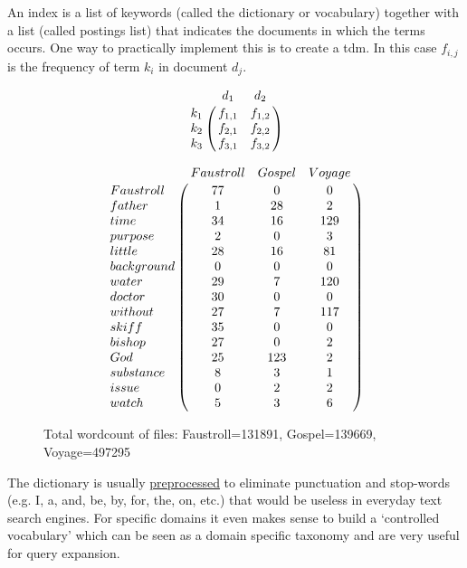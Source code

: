 An index is a list of keywords (called the dictionary or vocabulary) together with a list (called postings list) that indicates the documents in which the terms occurs. One way to practically implement this is to create a \gls{tdm}. In this case $f_{i,j}$ is the frequency of term $k_{i}$ in document $d_{j}$.

\begin{equation}
  \bbordermatrix{~ & d_1 & d_2 \cr %
        k_1 & f_{1,1} & f_{1,2} \cr %
        k_2 & f_{2,1} & f_{2,2} \cr %
        k_3 & f_{3,1} & f_{3,2}}
\label{eq:tdm}
\end{equation}


\begin{figure}[hb]
\[
  \bbordermatrix{
    ~ & Faustroll & Gospel & Voyage \cr %
    Faustroll & 77 & 0 & 0 \cr %
    father & 1 & 28 & 2 \cr %
    time & 34 & 16 & 129 \cr %
    purpose & 2 & 0 & 3 \cr %
    little & 28 & 16 & 81 \cr %
    background & 0 & 0 & 0 \cr %
    water & 29 & 7 & 120 \cr %
    doctor & 30 & 0 & 0 \cr %
    without & 27 & 7 & 117 \cr %
    skiff & 35 & 0 & 0 \cr %
    bishop & 27 & 0 & 2 \cr %
    God & 25 & 123 & 2 \cr %
    substance & 8 & 3 & 1 \cr %
    issue & 0 & 2 & 2 \cr %
    watch & 5 & 3 & 6
  }
\]
\caption{Total wordcount of files: Faustroll=131891, Gospel=139669, Voyage=497295}
\label{termdocs}
\end{figure}


The dictionary is usually \hyperlink{stemming}{preprocessed} to eliminate punctuation and stop-words (e.g. I, a, and, be, by, for, the, on, etc.) that would be useless in everyday text search engines. For specific domains it even makes sense to build a `controlled vocabulary' which can be seen as a domain specific taxonomy and are very useful for query expansion.

%
%
%


